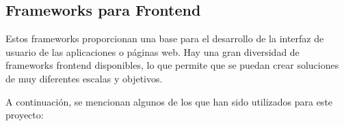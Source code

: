 \subsection{Frameworks para Frontend}
Estos frameworks proporcionan una base para el desarrollo de la interfaz de usuario de las aplicaciones o páginas web. Hay una gran diversidad de frameworks frontend disponibles, lo que permite que se puedan crear soluciones de muy diferentes escalas y objetivos.

A continuación, se mencionan algunos de los que han sido utilizados para este proyecto:
    
    
    